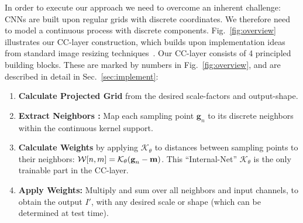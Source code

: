 In order to execute our approach we need to overcome an inherent challenge:
CNNs are built upon regular grids with discrete coordinates. 
We therefore need to model a continuous process with discrete components. 
Fig.~\ref{fig:overview} illustrates our CC-layer construction, which builds upon implementation ideas from standard image resizing techniques~\cite{MATLAB:2010}. 
Our CC-layer consists of 4 principled building blocks. These are marked by numbers in Fig.~\ref{fig:overview}, and are described in detail in Sec.~\ref{sec:implement}: 
\begin{enumerate}[noitemsep,nolistsep,leftmargin=*]
\item \textbf{Calculate Projected Grid } 
from the desired scale-factors and  output-shape. 
\item \textbf{Extract Neighbors :} Map each sampling point $\textbf{g}_n$ to its discrete neighbors  within the continuous kernel support. 
\item \textbf{Calculate Weights}  by applying \textbf{$\mathcal{K}_\theta$} to distances between sampling points to their neighbors:
$\textcolor{black}{\mathcal{W}\textbf{}{[n,m]}} = \mathcal{K}_\theta(\textbf{g}_n-\textbf{m})$.
This ``Internal-Net''  \textbf{$\mathcal{K}_\theta$} is the only trainable part in the CC-layer.
\item \textbf{Apply Weights:}  Multiply  and sum over all neighbors and input channels, to obtain the output  $I'$, with any desired scale or shape (which can be determined at test time).
\end{enumerate}

